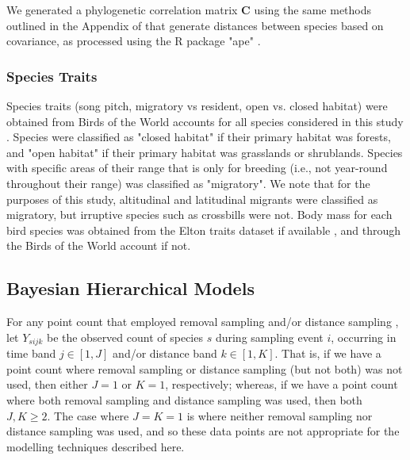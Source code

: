 \documentclass[12pt]{article}
\begin{document}
\par We generated a phylogenetic correlation matrix $\mathbf{C}$ using the same methods outlined in the Appendix of \citet{solymos_phylogeny_2018} that generate distances between species based on covariance, as processed using the R package "ape" \citep{paradis_ape_2019}.

\subsubsection{Species Traits}
\par Species traits (song pitch, migratory vs resident, open vs. closed habitat) were obtained from Birds of the World accounts for all species considered in this study \citep{billerman_birds_2022}. 
Species were classified as "closed habitat" if their primary habitat was forests, and "open habitat" if their primary habitat was grasslands or shrublands.
Species with specific areas of their range that is only for breeding (i.e., not year-round throughout their range) was classified as "migratory".
We note that for the purposes of this study, altitudinal and latitudinal migrants were classified as migratory, but irruptive species such as crossbills were not.
Body mass for each bird species was obtained from the Elton traits dataset if available \citep{wilman_eltontraits_2014}, and through the Birds of the World account \citep{billerman_birds_2022} if not.

\subsection{Bayesian Hierarchical Models}

\par For any point count that employed removal sampling \citep{alldredge_time--detection_2007, farnsworth_removal_2002} and/or distance sampling \citep{buckland_introduction_2001, buckland_distance_2015}, let $Y_{sijk}$ be the observed count of species $s$ during sampling event $i$, occurring in time band $j \in [1,J]$ and/or distance band $k \in [1,K]$.
That is, if we have a point count where removal sampling or distance sampling (but not both) was not used, then either $J = 1$ or $K = 1$, respectively; whereas, if we have a point count where both removal sampling and distance sampling was used, then both $J,K \geq 2$.
The case where $J = K = 1$ is where neither removal sampling nor distance sampling was used, and so these data points are not appropriate for the modelling techniques described here.
\end{document}
